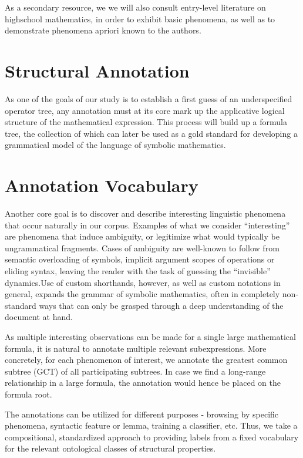 As a secondary resource, we we will also consult entry-level literature on highschool mathematics, in order to exhibit basic phenomena, as well as to demonstrate phenomena apriori known to the authors.

\section{Structural Annotation}

As one of the goals of our study is to establish a first guess of an underspecified operator tree, any annotation must at its core mark up the applicative logical structure of the mathematical expression. This process will build up a formula tree, the collection of which can later be used as a gold standard for developing a grammatical model of the language of symbolic mathematics.

\section{Annotation Vocabulary}

Another core goal is to discover and describe interesting linguistic phenomena that occur naturally in our corpus. Examples of what we consider ``interesting'' are phenomena that induce ambiguity, or legitimize what would typically be ungrammatical fragments. Cases of ambiguity are well-known to follow from semantic overloading of symbols, implicit argument scopes of operations or eliding syntax, leaving the reader with the task of guessing the ``invisible'' dynamics.Use of custom shorthands, however, as well as custom notations in general, expands the grammar of symbolic mathematics, often in completely non-standard ways that can only be grasped through a deep understanding of the document at hand.

As multiple interesting observations can be made for a single large mathematical formula, it is natural to annotate multiple relevant subexpressions. More concretely, for each phenomenon of interest, we annotate the greatest common subtree (GCT) of all participating subtrees. In case we find a long-range relationship in a large formula, the annotation would hence be placed on the formula root.

The annotations can be utilized for different purposes - browsing by specific phenomena, syntactic feature or lemma, training a classifier, etc. Thus, we take a compositional, standardized approach to providing labels from a fixed vocabulary for the relevant ontological classes of structural properties.

